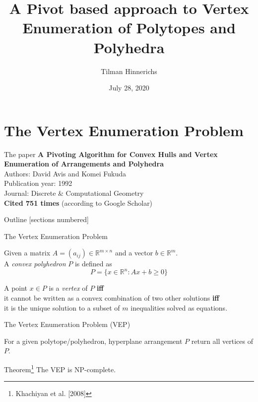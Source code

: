 \documentclass[10pt]{beamer}
\title{A Pivot based approach to Vertex Enumeration of Polytopes and Polyhedra}
\author{Tilman Hinnerichs}
\institute{Hauptseminar \glqq Selected Topics in Logic and Verification\grqq{} -- TU Dresden}
\date{July 28, 2020}
\begin{document}
	
\begin{frame}{}
	\titlepage
\end{frame}

\section{The Vertex Enumeration Problem}
\begin{frame}{The paper}
	\textbf{\large{\glqq A Pivoting Algorithm for Convex Hulls and Vertex Enumeration of Arrangements and Polyhedra\grqq{}}}\\
	\vspace{0.5cm}
	Authors: David Avis and Komei Fukuda\\
	Publication year: 1992\\
	Journal: Discrete \& Computational Geometry\\
	\pause 
	\textbf{Cited 751 times} (according to Google Scholar)
	
\end{frame}

\begin{frame}{Outline}
	[sections numbered]
	\tableofcontents
\end{frame}


\begin{frame}{The Vertex Enumeration Problem}
	\begin{definition}
		Given a matrix $A=(a_{ij}) \in \mathbb{R}^{m\times n}$ and a vector $b \in \mathbb{R}^m$.\\
		
		A \textit{convex polyhedron} $P$ is defined as
		\begin{equation}
			P = \{ x\in \mathbb{R}^n: Ax+b\geq 0 \}
		\end{equation}
	\end{definition}
	\pause 
	\begin{definition}
		A point $x\in P$ is a \textit{vertex} of $P$ \textbf{iff}\\
		it cannot be written as a convex combination of two other solutions \textbf{iff}\\
		it is the unique solution to a subset of $m$ inequalities solved as equations. 
	\end{definition}
	
\end{frame}

\begin{frame}{The Vertex Enumeration Problem (VEP)}
	\begin{definition}
		For a given polytope/polyhedron, hyperplane arrangement $P$ return all vertices of $P$.
		
	\end{definition}
	\pause 
	\begin{alertblock}{Theorem\footnote{Khachiyan et al. [2008]}}
		The VEP is NP-complete.
	\end{alertblock}
\end{frame}
\end{document}
